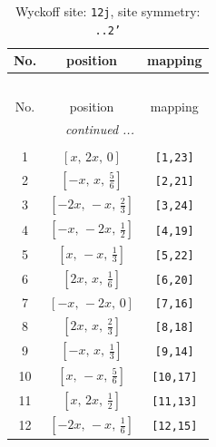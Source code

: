 \documentclass[fleqn,8pt]{jsarticle}
\begin{document}
\begin{longtable}{ccc}
\caption{Wyckoff site: {\tt 12j}, site symmetry: {\tt ..2'}}
 \\
 \hline \hline
No. & position & mapping \\ \hline \endfirsthead

\multicolumn{2}{l}{\tablename\ \thetable{}} \\
 \hline \hline
No. & position & mapping \\ \hline \endhead

 \hline \hline
\multicolumn{2}{r}{\footnotesize\it continued ...} \\ \endfoot

 \hline \hline
\multicolumn{2}{r}{} \\ \endlastfoot

1 & $\left[ x,\, 2 x,\, 0 \right]$ & {\tt [1,23]} \\ \hline
2 & $\left[ - x,\, x,\, \frac{5}{6} \right]$ & {\tt [2,21]} \\ \hline
3 & $\left[ - 2 x,\, - x,\, \frac{2}{3} \right]$ & {\tt [3,24]} \\ \hline
4 & $\left[ - x,\, - 2 x,\, \frac{1}{2} \right]$ & {\tt [4,19]} \\ \hline
5 & $\left[ x,\, - x,\, \frac{1}{3} \right]$ & {\tt [5,22]} \\ \hline
6 & $\left[ 2 x,\, x,\, \frac{1}{6} \right]$ & {\tt [6,20]} \\ \hline
7 & $\left[ - x,\, - 2 x,\, 0 \right]$ & {\tt [7,16]} \\ \hline
8 & $\left[ 2 x,\, x,\, \frac{2}{3} \right]$ & {\tt [8,18]} \\ \hline
9 & $\left[ - x,\, x,\, \frac{1}{3} \right]$ & {\tt [9,14]} \\ \hline
10 & $\left[ x,\, - x,\, \frac{5}{6} \right]$ & {\tt [10,17]} \\ \hline
11 & $\left[ x,\, 2 x,\, \frac{1}{2} \right]$ & {\tt [11,13]} \\ \hline
12 & $\left[ - 2 x,\, - x,\, \frac{1}{6} \right]$ & {\tt [12,15]} \\
\end{longtable}
\renewcommand{\arraystretch}{1.2}
\end{document}
